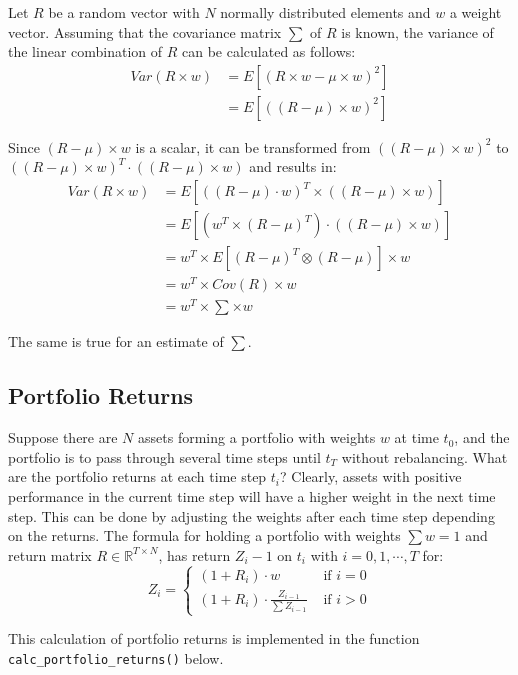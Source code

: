 \documentclass[
  oneside]{book}
\begin{document}
Let \(R\) be a random vector with \(N\) normally distributed elements and \(w\) a weight vector. Assuming that the covariance matrix \(\sum\) of \(R\) is known, the variance of the linear combination of \(R\) can be calculated as follows:
\begin{align*}
  Var(R \times w) &= E[(R \times w - \mu \times w)^2] \\
  &= E[((R - \mu) \times w)^2]
\end{align*}

Since \((R - \mu) \times w\) is a scalar, it can be transformed from \(((R - \mu) \times w)^2\) to \(((R - \mu) \times w)^T \cdot ((R - \mu) \times w)\) and results in:
\begin{align*}
  Var(R \times w) &= E[((R - \mu) \cdot w)^T \times ((R - \mu) \times w)]\\ 
  &= E[(w^T \times (R - \mu)^T) \cdot ((R - \mu) \times w)]\\ 
  &= w^T \times E[(R - \mu)^T \otimes (R - \mu)] \times w \\
  &= w^T \times Cov(R) \times w \\
  &= w^T \times \textstyle\sum \times w
\end{align*}

The same is true for an estimate of \(\textstyle\sum\).

\hypertarget{portfolioreturns}{%
\subsection{Portfolio Returns}\label{portfolioreturns}}

Suppose there are \(N\) assets forming a portfolio with weights \(w\) at time \(t_0\), and the portfolio is to pass through several time steps until \(t_T\) without rebalancing. What are the portfolio returns at each time step \(t_i\)? Clearly, assets with positive performance in the current time step will have a higher weight in the next time step. This can be done by adjusting the weights after each time step depending on the returns. The formula for holding a portfolio with weights \(\textstyle\sum w = 1\) and return matrix \(R \in \mathbb{R}^{T \times N}\), has return \(Z_i-1\) on \(t_i\) with \(i=0, 1, \cdots, T\) for:
\[
  Z_i =
  \begin{cases}
  (1+R_i)\cdot w &\text{ if }i=0\\
  (1+R_i)\cdot \frac{Z_{i-1}}{\sum Z_{i-1}} &\text{ if }i>0
  \end{cases}
\]

This calculation of portfolio returns is implemented in the function \texttt{calc\_portfolio\_returns()} below.
\end{document}
